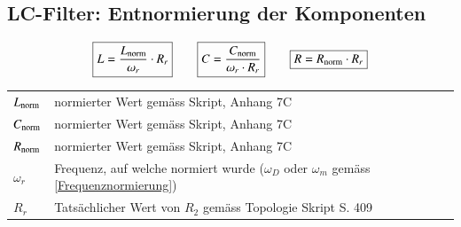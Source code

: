 \subsection{LC-Filter: Entnormierung der Komponenten}
\label{Entnormierung Komponenten}

$$ \boxed{ L = \frac{L_{\rm norm}}{\omega_r} \cdot R_r}
\qquad \boxed{ C = \frac{C_{\rm norm}}{\omega_r \cdot R_r }}
\qquad \boxed{ R = R_{\rm norm} \cdot R_r } $$

\begin{center}
    \begin{tabular}{ll}
        $L_{\rm norm}$  & normierter Wert gemäss Skript, Anhang 7C \\
        $C_{\rm norm}$  & normierter Wert gemäss Skript, Anhang 7C \\
        $R_{\rm norm}$  & normierter Wert gemäss Skript, Anhang 7C \\
        $\omega_r$  & Frequenz, auf welche normiert wurde ($\omega_D$ oder $\omega_m$ gemäss \ref{Frequenznormierung}) \\
        $R_r$       & Tatsächlicher Wert von $R_2$ gemäss Topologie Skript S. 409
    \end{tabular}
\end{center}
    
